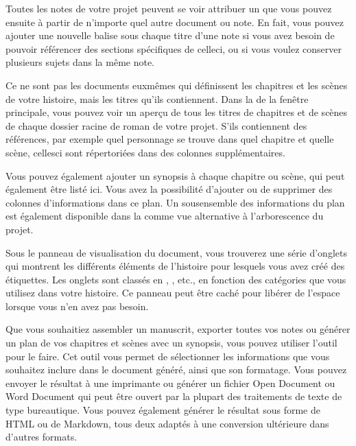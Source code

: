 \documentclass[a4paper,11pt,french]{sphinxmanual}
\begin{document}
\begin{description}
\sphinxAtStartPar
Toutes les notes de votre projet peuvent se voir attribuer un {\hyperref[\detokenize{int_glossary:term-Tag}]{}} que vous pouvez ensuite {\hyperref[\detokenize{int_glossary:term-Reference}]{}} à partir de n’importe quel autre document ou note. En fait, vous pouvez ajouter une nouvelle balise sous chaque titre d’une note si vous avez besoin de pouvoir référencer des sections spécifiques de celle\sphinxhyphen{}ci, ou si vous voulez conserver plusieurs sujets dans la même note.

\sphinxAtStartPar
Ce ne sont pas les documents eux\sphinxhyphen{}mêmes qui définissent les chapitres et les scènes de votre histoire, mais les titres qu’ils contiennent. Dans la  de la fenêtre principale, vous pouvez voir un aperçu de tous les titres de chapitres et de scènes de chaque dossier racine de roman de votre projet. S’ils contiennent des références, par exemple quel personnage se trouve dans quel chapitre et quelle scène, celles\sphinxhyphen{}ci sont répertoriées dans des colonnes supplémentaires.

\sphinxAtStartPar
Vous pouvez également ajouter un synopsis à chaque chapitre ou scène, qui peut également être listé ici. Vous avez la possibilité d’ajouter ou de supprimer des colonnes d’informations dans ce plan. Un sous\sphinxhyphen{}ensemble des informations du plan est également disponible dans la  comme vue alternative à l’arborescence du projet.

\sphinxAtStartPar
Sous le panneau de visualisation du document, vous trouverez une série d’onglets qui montrent les différents éléments de l’histoire pour lesquels vous avez créé des étiquettes. Les onglets sont classés en , , etc., en fonction des catégories que vous utilisez dans votre histoire. Ce panneau peut être caché pour libérer de l’espace lorsque vous n’en avez pas besoin.

\sphinxAtStartPar
Que vous souhaitiez assembler un manuscrit, exporter toutes vos notes ou générer un plan de vos chapitres et scènes avec un synopsis, vous pouvez utiliser l’outil  pour le faire. Cet outil vous permet de sélectionner les informations que vous souhaitez inclure dans le document généré, ainsi que son formatage. Vous pouvez envoyer le résultat à une imprimante ou générer un fichier Open Document ou Word Document qui peut être ouvert par la plupart des traitements de texte de type bureautique. Vous pouvez également générer le résultat sous forme de HTML ou de Markdown, tous deux adaptés à une conversion ultérieure dans d’autres formats.

\end{description}
\end{document}
